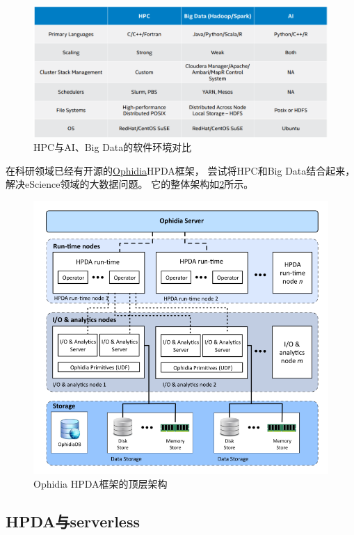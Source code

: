 \begin{figure}[ht!]
    \centering
    \includegraphics[width=\linewidth]{images/hpc-bigdata-ai-envs.png}
    \caption{HPC与AI、Big Data的软件环境对比\cite{bring_ai_to_hpc}}
    \label{hpc_bigdata_ai_envs}
\end{figure}

在科研领域已经有开源的\href{https://ophidia.cmcc.it/}{Ophidia}\;HPDA框架，
尝试将HPC和Big Data结合起来，解决eScience领域的大数据问题。
它的整体架构如\cref{ophidia_arch}所示\cite{hpda_escience}。

\begin{figure}[ht!]
    \centering
    \includegraphics[width=\linewidth]{images/ophidia_hpda_arch.png}
    \caption{Ophidia HPDA框架的顶层架构}
    \label{ophidia_arch}
\end{figure}

\subsection{HPDA与serverless}

